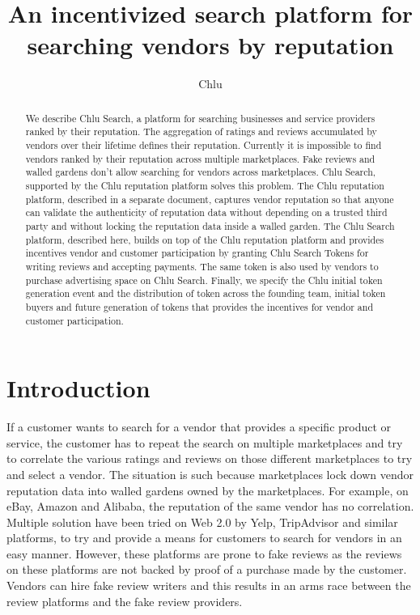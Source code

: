 \documentclass[a4paper]{article}
\title{An incentivized search platform for searching vendors by reputation}
\author{
  Chlu
}
\begin{document}
\maketitle

\begin{abstract}

  We describe Chlu Search, a platform for searching businesses and
  service providers ranked by their reputation. The aggregation of
  ratings and reviews accumulated by vendors over their lifetime
  defines their reputation. Currently it is impossible to find vendors
  ranked by their reputation across multiple marketplaces. Fake
  reviews and walled gardens don't allow searching for vendors across
  marketplaces. Chlu Search, supported by the Chlu reputation platform
  solves this problem. The Chlu reputation platform, described in a
  separate document, captures vendor reputation so that anyone can
  validate the authenticity of reputation data without depending on a
  trusted third party and without locking the reputation data inside a
  walled garden. The Chlu Search platform, described here, builds on
  top of the Chlu reputation platform and provides incentives vendor
  and customer participation by granting Chlu Search Tokens for
  writing reviews and accepting payments. The same token is also used
  by vendors to purchase advertising space on Chlu Search. Finally, we
  specify the Chlu initial token generation event and the distribution
  of token across the founding team, initial token buyers and future
  generation of tokens that provides the incentives for vendor and
  customer participation.

\end{abstract}

\section{Introduction}

If a customer wants to search for a vendor that provides a specific
product or service, the customer has to repeat the search on multiple
marketplaces and try to correlate the various ratings and reviews on
those different marketplaces to try and select a vendor. The situation
is such because marketplaces lock down vendor reputation data into
walled gardens owned by the marketplaces. For example, on eBay, Amazon
and Alibaba, the reputation of the same vendor has no
correlation. Multiple solution have been tried on Web 2.0 by Yelp,
TripAdvisor and similar platforms, to try and provide a means for
customers to search for vendors in an easy manner. However, these
platforms are prone to fake reviews as the reviews on these platforms
are not backed by proof of a purchase made by the customer. Vendors
can hire fake review writers and this results in an arms race between
the review platforms and the fake review providers.
\end{document}
